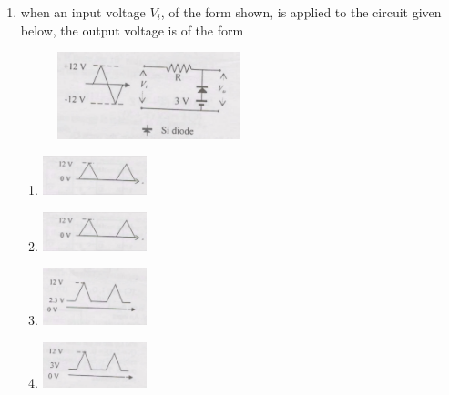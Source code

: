 \documentclass[journal,12pt,onecolumn]{IEEEtran}
\begin{document}
\begin{enumerate}[itemsep = 1em]
\begin{multicols}{4}
\begin{enumerate}
    \item 42
    \item 48
    \item 56
    \item 70
\end{enumerate} 
\end{multicols}

\item when an input voltage $V_i$, of the form shown, is applied to the circuit given below, the output voltage is of the form

\hfill{}

\begin{figure}[ht!]
    \centering
    \includegraphics[width=0.5\textwidth]{fig11.jpeg}
    \caption{}
    \label{fig:fig11.jpeg}
\end{figure}
\begin{multicols}{2}
\begin{enumerate}
    \item \includegraphics[width=0.25\textwidth]{fig12.jpeg} \hfill
    \item \includegraphics[width=0.25\textwidth]{fig13.jpeg} \hfill
    \item \includegraphics[width=0.25\textwidth]{fig14.jpeg} \hfill
    \item \includegraphics[width=0.25\textwidth]{fig15.jpeg} \hfill
\end{enumerate}
\end{multicols}




\end{enumerate}
\end{document}
